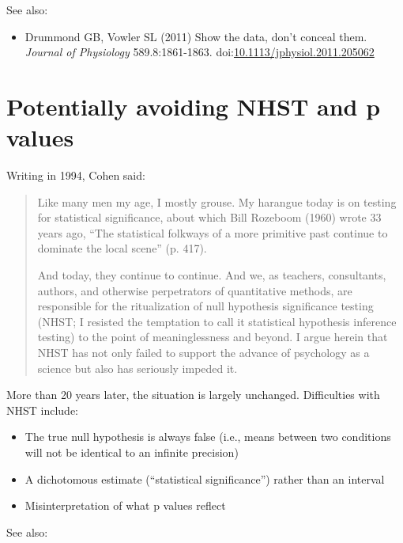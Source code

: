 \documentclass[letterpaper,oneside,11pt,article, portrait]{memoir}
\newcommand{\doi}[1]{doi:\href{http://dx.doi.org/#1}{#1}}
\newcommand{\journal}[1]{\textit{#1}} 			%
\begin{document}
\vspace{1em} \noindent See also:

\begin{itemize}

\item Drummond GB, Vowler SL (2011) Show the data, don't conceal them. \journal{Journal of Physiology} 589.8:1861-1863. \doi{10.1113/jphysiol.2011.205062}

\end{itemize}



\chapter{Potentially avoiding NHST and p values} \label{avoidNHST}

Writing in 1994, Cohen said:

\begin{quote}
Like many men my age, I mostly grouse. My harangue today is on testing for statistical significance, about which Bill Rozeboom (1960) wrote 33 years ago, ``The statistical folkways of a more primitive past continue to dominate the local scene'' (p. 417).

And today, they continue to continue. And we, as teachers, consultants, authors, and otherwise perpetrators of quantitative methods, are responsible for the ritualization of null hypothesis significance testing (NHST; I resisted the temptation to call it statistical hypothesis inference testing) to the point of meaninglessness and beyond. I argue herein that NHST has not only failed to support the advance of psychology as a science but also has seriously impeded it.
\end{quote}

\noindent More than 20 years later, the situation is largely unchanged. Difficulties with NHST include:

\begin{itemize}
\item The true null hypothesis is always false (i.e., means between two conditions will not be identical to an infinite precision)
\item A dichotomous estimate (``statistical significance'') rather than an interval
\item Misinterpretation of what p values reflect
\end{itemize}

\vspace{1em} \noindent See also:
\end{document}
